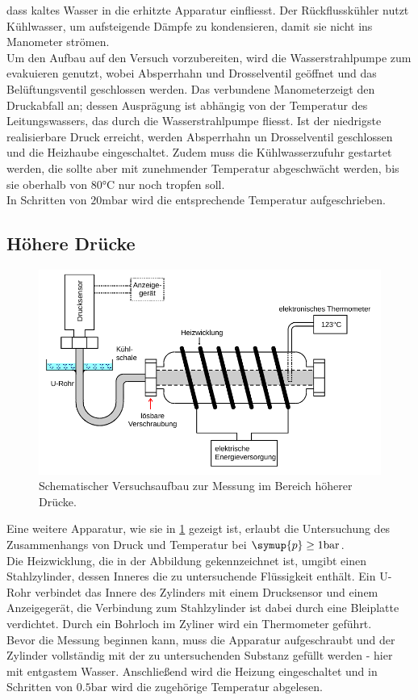 dass kaltes Wasser in die erhitzte Apparatur einfliesst. Der Rückflusskühler nutzt Kühlwasser, um
aufsteigende Dämpfe zu kondensieren, damit sie nicht ins Manometer strömen. \\
Um den Aufbau auf den Versuch vorzubereiten, wird die Wasserstrahlpumpe zum evakuieren genutzt,
wobei Absperrhahn und Drosselventil geöffnet und das Belüftungsventil geschlossen werden.
Das verbundene Manometerzeigt den Druckabfall an; dessen Ausprägung ist abhängig von der
Temperatur des Leitungswassers, das durch die Wasserstrahlpumpe fliesst. Ist der niedrigste realisierbare
Druck erreicht, werden Absperrhahn un Drosselventil geschlossen und die Heizhaube eingeschaltet.
Zudem muss die Kühlwasserzufuhr gestartet werden, die sollte aber mit zunehmender Temperatur abgeschwächt 
werden, bis sie oberhalb von $80 \si{\degreeCelsius}$ nur noch tropfen soll.\\
In Schritten von $20 \si{\milli\bar}$ wird die entsprechende Temperatur aufgeschrieben.

\subsection{Höhere Drücke}
\begin{figure}
    \centering
    \includegraphics[width=\textwidth]{apparatur2.png}
    \caption{Schematischer Versuchsaufbau zur Messung im Bereich höherer Drücke.}
    \label{fig:app2}
\end{figure}
Eine weitere Apparatur, wie sie in \ref{fig:app2} gezeigt ist, erlaubt die Untersuchung des Zusammenhangs
von Druck und Temperatur bei $\symup{p} \geq 1 \si{\bar}$.\\
Die Heizwicklung, die in der Abbildung gekennzeichnet ist, umgibt einen Stahlzylinder, dessen Inneres
die zu untersuchende Flüssigkeit enthält. Ein U-Rohr verbindet das Innere des Zylinders mit einem Drucksensor
und einem Anzeigegerät, die Verbindung zum Stahlzylinder ist dabei durch eine Bleiplatte 
verdichtet. Durch ein Bohrloch im Zyliner wird ein Thermometer geführt.\\
Bevor die Messung beginnen kann, muss die Apparatur aufgeschraubt und der Zylinder vollständig mit
der zu untersuchenden Substanz gefüllt werden - hier mit entgastem Wasser. Anschließend wird die Heizung
eingeschaltet und in Schritten von $0.5 \si{\bar}$ wird die zugehörige Temperatur abgelesen.


